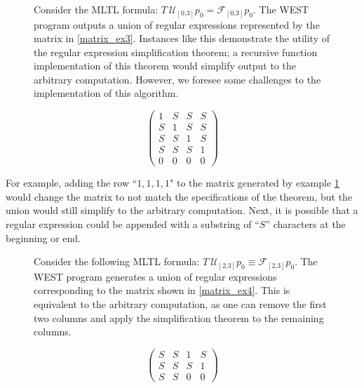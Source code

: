 \documentclass[runningheads]{llncs}
\begin{document}
\begin{figure}[h!]
\begin{minipage}{.62\textwidth}
\begin{example} \label{example1}
Consider the MLTL formula:
$T \ \mathcal{U_{[\text{0,3}]}} p_0 = \mathcal{F_{[\text{0,3}]}}p_0$.
The WEST program outputs a union of regular expressions represented by the matrix in \eqref{matrix_ex3}. Instances like this demonstrate the utility of the regular expression simplification theorem; a recursive function implementation of this theorem would simplify output to the arbitrary computation. However, we foresee some challenges to the implementation of this algorithm.
\end{example}
\end{minipage}
\begin{minipage}{.38\textwidth}
\begin{equation} \label{matrix_ex3}
    \begin{pmatrix}
    1 & S & S & S\\
    S & 1 & S & S\\
    S & S & 1 & S\\
    S & S & S & 1\\
    0 & 0 & 0 & 0
    \end{pmatrix}
\end{equation}
\end{minipage}
\end{figure}
For example, adding the row ``$1,1,1,1$" to the matrix generated by example \ref{example1} would change the matrix to not match the specifications of the theorem, but the union would still simplify to the arbitrary computation. Next, it is possible that a regular expression could be appended with a substring of ``$S$'' characters at the beginning or end.
\begin{figure}[h!]
\begin{minipage}{.62\textwidth}
\begin{example} \label{example2}
Consider the following MLTL formula: $T \ \mathcal{U_{[\text{2,3}]}} p_0 \equiv \mathcal{F_{[\text{2,3}]}}p_0$. The WEST program generates a union of regular expressions corresponding to the matrix shown in \eqref{matrix_ex4}. This is equivalent to the arbitrary computation, as one can remove the first two columns and apply the simplification theorem to the remaining columns.
\end{example}
\end{minipage}
\begin{minipage}{.38\textwidth}
\begin{equation} \label{matrix_ex4}
    \begin{pmatrix}
      S & S & 1 & S \\
      S & S & S & 1 \\
      S & S & 0 & 0
    \end{pmatrix}
\end{equation}
\end{minipage}
\end{figure}
\end{document}
